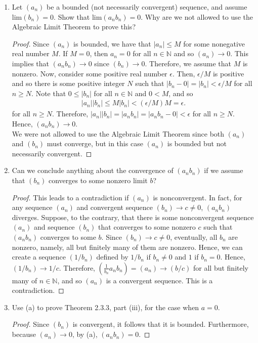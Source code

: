 \documentclass[12pt]{article}
\newcommand{\N}{\mathbb{N}}
\newcommand{\Lim}[1]{\mathrm{lim}\left( #1\right)}
\newenvironment{problem}[2][Problem]{\begin{trivlist} \item[\hskip \labelsep {\bfseries #1}\hskip \labelsep {\bfseries #2.}]}{\end{trivlist}}
\begin{document}
    \begin{problem}{2.3.9}
    \begin{enumerate}
      \item Let $(a_{n})$ be a bounded (not necessarily convergent) sequence, and assume $\Lim{b_{n}} = 0$. Show that $\Lim{a_{n}b_{n}} = 0$. Why are we not allowed to use the Algebraic Limit Theorem to prove this?
    \begin{proof}
      Since $(a_{n})$ is bounded, we have that $|a_{n}|\leq M$ for some nonegative real number $M$. If $M=0$, then $a_{n} = 0$ for all $n\in \N$ and so $(a_{n}) \to 0$. This implies that $(a_{n}b_{n}) \to 0$ since $(b_{n})\to 0$. Therefore, we assume that $M$ is nonzero. Now, consider some positive real number $\epsilon$. Then, $\epsilon/M$ is positive and so there is some positive integer $N$ such that $|b_{n} -0| = |b_{n}| < \epsilon/M$ for all $n\geq N$. Note that $0\leq |b_{n}|$ for all $n\in \N$ and $0<M$, and so
    \begin{align*}
      |a_{n}||b_{n}| \leq M|b_{n}| < (\epsilon/M) M = \epsilon.
    \end{align*}
    for all $n\geq N$. Therefore, $|a_{n}||b_{n}| = |a_{n}b_{n}| = |a_{n}b_{n} - 0| < \epsilon$ for all $n\geq N$. Hence, $(a_{n}b_{n}) \to 0$.\\

  We were not allowed to use the Algebraic Limit Theorem since both $(a_{n})$ and $(b_{n})$ must converge, but in this case $(a_{n})$ is bounded but not necessarily convergent. 
    \end{proof}
      \item Can we conclude anything about the convergence of $(a_{n}b_{n})$ if we assume that $(b_{n})$ converges to some nonzero limit $b$?
    \begin{proof}
      This leads to a contradiction if $(a_{n})$ is nonconvergent. In fact, for any sequence $(a_{n})$ and convergent sequence $(b_{n})\to c\neq 0$, $(a_{n}b_{n})$ diverges. Suppose, to the contrary, that there is some nonconvergent sequence $(a_{n})$ and sequence $(b_{n})$ that converges to some nonzero $c$ such that $(a_{n}b_{n})$ converges to some $b$. Since $(b_{n})\to c\neq 0$, eventually, all $b_{n}$ are nonzero, namely, all but finitely many of them are nonzero. Hence, we can create a sequence $(1/b_{n})$ defined by $1/b_{n}$ if $b_{n}\neq 0$ and $1$ if $b_{n}=0$. Hence, $(1/b_{n}) \to 1/c$. Therefore, $\left( \frac{1}{b_{n}}a_{n}b_{n} \right) = (a_{n}) \to (b/c)$ for all but finitely many of $n\in \N$, and so $(a_{n})$ is a convergent sequence. This is a contradiction.	
    \end{proof}
      \item Use (a) to prove Theorem 2.3.3, part (iii), for the case when $a=0$.
    \begin{proof}
      Since $(b_{n})$ is convergent, it follows that it is bounded. Furthermore, because $(a_{n})\to 0$, by (a), $(a_{n}b_{n}) = 0$.
    \end{proof}
    \end{enumerate}
    \end{problem}
\end{document}
